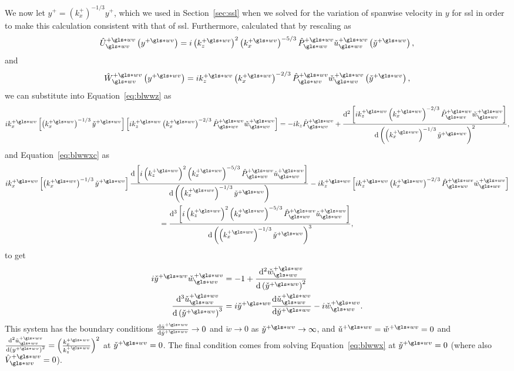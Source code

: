 We now let $y^{+}=\left( k_x^{+} \right) ^{-1 /3}y^{+}$, which we used in Section~\ref{sec:ssl} when we solved for the variation of spanwise velocity in $y$ for  \gls*{ssl} in order to make this calculation consistent with that of \gls*{ssl}. Furthermore, \textcite{chernyshenko2013} calculated that by rescaling as
\begin{equation}
	\hat{U}\pw\ww \left( y\pw \right)  = i\left( k_z\pw \right) ^2 \left( k_x\pw \right) ^{-5 /3}  \hat{P}\pw\ww \check{u}\pw\ww \left( \check{y}\pw \right)
,\end{equation}
and
\begin{equation}
	\hat{W}\pw\ww \left( y\pw \right) = ik_z\pw \left( k_x\pw \right) ^{-2 /3}\hat{P}\pw\ww \check{w}\pw\ww \left( \check{y}\pw \right)
,\end{equation}
we can substitute into Equation~\eqref{eq:blwwz} as
\begin{equation*}
	ik_x\pw \left[ \left( k_x\pw \right) ^{-1 /3} \check{y}\pw\right] \left[ i k_z\pw \left( k_x\pw \right) ^{-2 /3}\hat{P}\pw\ww \check{w}\pw\ww \right] = -ik_z \hat{P}\ww\pw\nonumber+\dv[2]{\left[i k_z\pw \left( k_x\pw \right) ^{-2 /3}\hat{P}\pw\ww \check{w}\pw\ww\right]}{\left(\left( k_x\pw \right) ^{-1 /3} \check{y}\pw\right)}
,\end{equation*}
and Equation~\eqref{eq:blwwxc} as
\begin{multline*}
	ik_x\pw \left[ \left( k_x\pw \right) ^{-1 /3} \check{y}\pw\right]\dv{\left[i\left( k_z\pw \right) ^2 \left( k_x\pw \right) ^{-5 /3}  \hat{P}\pw\ww \check{u}\pw\ww \right]}{\left( \left( k_x\pw \right) ^{-1 /3} \check{y}\pw\right)} - ik_z\pw \left[ ik_z\pw \left( k_x\pw \right) ^{-2 /3}\hat{P}\pw\ww \check{w}\pw\ww \right] \\
	=\dv[3]{\left[i\left( k_z\pw \right) ^2 \left( k_x\pw \right) ^{-5 /3}  \hat{P}\pw\ww \check{u}\pw\ww \right]}{\left( \left( k_x\pw \right) ^{-1 /3} \check{y}\pw\right)}
,\end{multline*}
to get
\begin{align}
	i\check{y}\pw \check{w}\pw\ww&=-1+\dv[2]{\check{w}\pw\ww}{\left( \check{y}\pw \right) }\label{eq:blwwzsim} \\
	\dv[3]{\check{u}\pw\ww}{\left( \check{y}\pw \right) } &= i\check{y}\pw \dv{\check{u}\pw\ww}{\check{y}\pw} -i\check{w}\pw\ww\label{eq:blwwxsim}
.\end{align}
This system has the boundary conditions $\dv{\check{u}\pw}{\check{y}\pw}\to0 $ and $\check{w}\to0$ as $\check{y}\pw\to\infty$, and $\check{u}\pw=\check{w}\pw=0$ and $\dv[2]{\check{u}\pw\ww}{\left( y\pw \right) } =\left(\frac{k_x\pw}{k_z\pw}\right)^2$ at $\check{y}\pw=0$. The final condition comes from solving Equation~\eqref{eq:blwwx} at $\check{y}\pw=0$ (where also $\hat{V}\pw\ww=0$).

